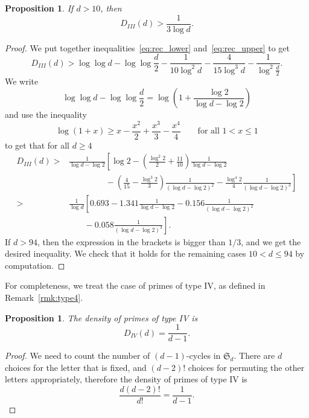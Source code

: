 \documentclass[11pt]{article}
\theoremstyle{plain}
\newtheorem{proposition}[theorem]{Proposition}
\theoremstyle{definition}
\theoremstyle{remark}
\numberwithin{equation}{section}
\renewcommand{\SS}{\mathfrak{S}}
\begin{document}
\begin{proposition}\label{prop:type3}
  If $d>10$, then
  \begin{equation*}
    D_{III}(d)>\frac{1}{3\log d}.
  \end{equation*}
\end{proposition}
\begin{proof}
  We put together inequalities~\eqref{eq:rec_lower} and~\eqref{eq:rec_upper}
  to get
  \begin{equation*}
    D_{III}(d)>\log\log d-\log\log\frac{d}{2}-\frac{1}{10\log^2 d}
    -\frac{4}{15\log^3 d}-\frac{1}{\log^2\frac{d}{2}}.
  \end{equation*}
  We write
  \begin{equation*}
    \log\log d - \log\log\frac{d}{2} =\log\left(1+\frac{\log 2}{\log d-\log
    2}\right)
  \end{equation*}
  and use the inequality
  \begin{equation*}
    \log(1+x)\geq x-\frac{x^2}{2}+\frac{x^3}{3}-\frac{x^4}{4}
    \qquad\text{for all }1<x\leq 1
  \end{equation*}
  to get that for all $d\geq 4$
  \begin{align*}
    D_{III}(d)>&\frac{1}{\log d-\log 2}\left[
      \log 2
      -\left(\frac{\log^2 2}{2}+\frac{11}{10}\right)\frac{1}{\log d-\log
      2}\right.\\
      &\left.\phantom{\frac{1}{\log d-\log 2}} 
      -\left(\frac{4}{15}-\frac{\log^3 2}{3}\right)\frac{1}{(\log d-\log 2)^2}
      -\frac{\log^4 2}{4}\frac{1}{(\log d-\log 2)^3}
      \right]\\
      >&\frac{1}{\log d}\left[
      0.693-1.341\frac{1}{\log d-\log 2}
      -0.156\frac{1}{(\log d-\log 2)^2}\right.\\
      &\left.\phantom{\frac{1}{\log d}}
      -0.058\frac{1}{(\log d-\log 2)^3}
      \right].
  \end{align*}
  If $d>94$, then the expression in the brackets is bigger than $1/3$, and we
  get the desired inequality.  We check that it holds for the remaining cases
  $10<d\leq 94$ by computation.
\end{proof}

For completeness, we treat the case of primes of type IV, as defined in
Remark~\ref{rmk:type4}.

\begin{proposition}\label{prop:type4}
  The density of primes of type IV is
  \begin{equation*}
    D_{IV}(d)=\frac{1}{d-1}.
  \end{equation*}
\end{proposition}
\begin{proof}
  We need to count the number of $(d-1)$-cycles in $\SS_d$.  There are $d$
  choices for the letter that is fixed, and $(d-2)!$ choices for permuting the
  other letters appropriately, therefore the density of primes of type IV is
  \begin{equation*}
    \frac{d(d-2)!}{d!}=\frac{1}{d-1}.
  \end{equation*}
\end{proof}
\end{document}
